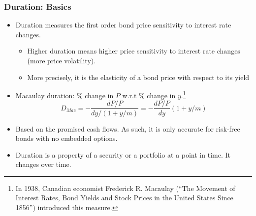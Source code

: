\documentclass[10pt]{beamer}
\begin{document}
\begin{frame}
	\frametitle{Duration: Basics}
	
	\begin{itemize} \itemsep15pt
		\item Duration measures the first order bond price sensitivity to interest rate changes.
		
		\begin{itemize}
			\item  Higher duration means higher price sensitivity to interest rate changes (more price volatility).
			\item More precisely, it is the elasticity of a bond price with respect to its yield
		\end{itemize}
		
		\item Macaulay duration: \% change in $P$ w.r.t \% change in $y$.\footnote{In 1938, Canadian economist Frederick R. Macaulay (``The Movement of Interest Rates, Bond Yields and Stock Prices in the United States Since 1856'') introduced this measure.}
		$$
		D_{Mac} = -\frac{dP/P}{dy/(1+y/m)} = -\frac{dP/P}{dy} (1+y/m)
		$$
		
		
		\item Based on the promised cash flows. As such, it is only accurate for risk-free bonds with no embedded options.
		\item Duration is a property of a security or a portfolio at a point in time. It changes over time.
	\end{itemize}
	
\end{frame}
\end{document}
